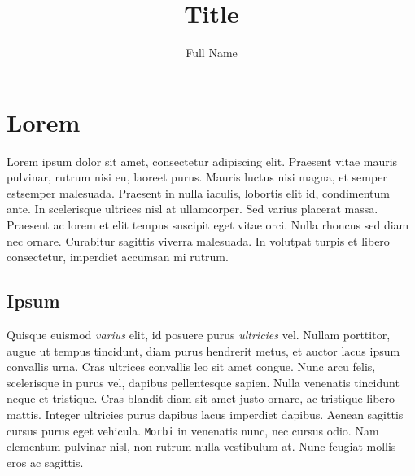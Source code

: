 \documentclass[a4paper,12pt]{article}
\title{Title}
\author{Full Name}
\date{}
\begin{document}




\pagestyle{empty}
\renewcommand{\contentsname}{\centering Contents}
\tableofcontents
\newpage



\pagestyle{fancy}
\cfoot{\thepage}
\rhead{}
\renewcommand{\headrulewidth}{0pt}
\renewcommand{\headheight}{14.5pt}
\renewcommand{\footrulewidth}{0.4pt}



\section{Lorem}

Lorem ipsum dolor sit amet, consectetur adipiscing elit. Praesent vitae mauris
pulvinar, rutrum nisi eu, laoreet purus. Mauris luctus nisi magna, et semper
estsemper malesuada. Praesent in nulla iaculis, lobortis elit id, condimentum
ante. In scelerisque ultrices nisl at ullamcorper. Sed varius placerat massa.
Praesent ac lorem et elit tempus suscipit eget vitae orci. Nulla rhoncus sed
diam nec ornare. Curabitur sagittis viverra malesuada. In volutpat turpis et
libero consectetur, imperdiet accumsan mi rutrum.

\subsection{Ipsum}
Quisque euismod \emph{varius} elit, id posuere purus \emph{ultricies} vel.
Nullam porttitor, augue ut tempus tincidunt, diam purus hendrerit metus,
et auctor lacus ipsum convallis urna. Cras ultrices convallis leo sit amet
congue. Nunc arcu felis, scelerisque in purus vel, dapibus pellentesque sapien.
Nulla venenatis tincidunt neque et tristique. Cras blandit diam sit amet justo
ornare, ac tristique libero mattis. Integer ultricies purus dapibus lacus
imperdiet dapibus. Aenean sagittis cursus purus eget vehicula.
\texttt{Morbi} in venenatis nunc, nec cursus odio. Nam elementum pulvinar
nisl, non rutrum nulla vestibulum at. Nunc feugiat mollis eros ac sagittis.
\end{document}
